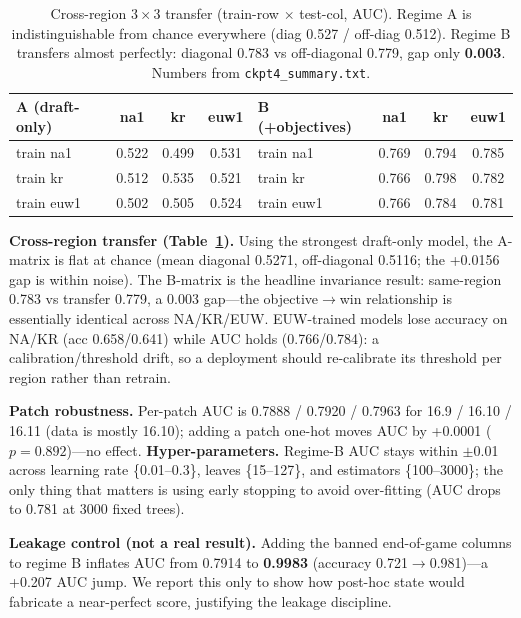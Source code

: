 \documentclass[sigconf,nonacm]{acmart}
\begin{document}
\begin{table}[t]
\caption{Cross-region $3\times3$ transfer (train-row $\times$ test-col, AUC).
Regime A is indistinguishable from chance everywhere (diag 0.527 / off-diag
0.512). Regime B transfers almost perfectly: diagonal 0.783 vs off-diagonal
0.779, gap only \textbf{0.003}. Numbers from \texttt{ckpt4\_summary.txt}.}
\label{tab:transfer}
\footnotesize
\begin{tabular}{lccc@{\hskip 3em}lccc}
\toprule
A (draft-only) & na1 & kr & euw1 & B (+objectives) & na1 & kr & euw1 \\
\midrule
train na1  & 0.522 & 0.499 & 0.531 & train na1  & 0.769 & 0.794 & 0.785 \\
train kr   & 0.512 & 0.535 & 0.521 & train kr   & 0.766 & 0.798 & 0.782 \\
train euw1 & 0.502 & 0.505 & 0.524 & train euw1 & 0.766 & 0.784 & 0.781 \\
\bottomrule
\end{tabular}
\end{table}

\textbf{Cross-region transfer (Table~\ref{tab:transfer}).} Using the strongest
draft-only model, the A-matrix is flat at chance (mean diagonal 0.5271,
off-diagonal 0.5116; the +0.0156 gap is within noise). The B-matrix is the
headline invariance result: same-region 0.783 vs transfer 0.779, a 0.003
gap---the objective$\rightarrow$win relationship is essentially identical across
NA/KR/EUW. EUW-trained models lose accuracy on NA/KR (acc 0.658/0.641) while AUC
holds (0.766/0.784): a calibration/threshold drift, so a deployment should
re-calibrate its threshold per region rather than retrain.

\textbf{Patch robustness.} Per-patch AUC is 0.7888 / 0.7920 / 0.7963 for 16.9 /
16.10 / 16.11 (data is mostly 16.10); adding a patch one-hot moves AUC by +0.0001
($p = 0.892$)---no effect. \textbf{Hyper-parameters.} Regime-B AUC stays within
$\pm$0.01 across learning rate \{0.01--0.3\}, leaves \{15--127\}, and estimators
\{100--3000\}; the only thing that matters is using early stopping to avoid
over-fitting (AUC drops to 0.781 at 3000 fixed trees).

\textbf{Leakage control (not a real result).} Adding the banned end-of-game
columns to regime B inflates AUC from 0.7914 to \textbf{0.9983} (accuracy
0.721$\rightarrow$0.981)---a +0.207 AUC jump. We report this only to show how
post-hoc state would fabricate a near-perfect score, justifying the leakage
discipline.
\end{document}
